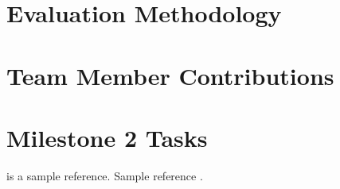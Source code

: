 \documentclass[preprint,nocopyrightspace]{sig-alternate}
\begin{document}
\section{Evaluation Methodology}
\section{Team Member Contributions}
\section{Milestone 2 Tasks}

\citet{DBLP:conf/sc/Rubio-GonzalezNNDKSBIH13} is a sample reference.
Sample reference \cite{DBLP:conf/sc/Rubio-GonzalezNNDKSBIH13}.


\end{document}
